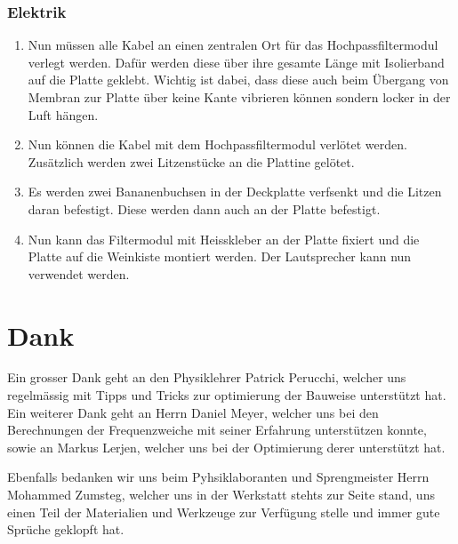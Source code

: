 \documentclass[a4paper,11pt]{report}
\begin{document}
\subsection{Elektrik}
\begin{enumerate}
    \item Nun müssen alle Kabel an einen zentralen Ort für das Hochpassfiltermodul verlegt werden. Dafür werden diese über ihre gesamte Länge mit Isolierband auf die Platte geklebt. Wichtig ist dabei, dass diese auch beim Übergang von Membran zur Platte über keine Kante vibrieren können sondern locker in der Luft hängen.
    \item Nun können die Kabel mit dem Hochpassfiltermodul verlötet werden. Zusätzlich werden zwei Litzenstücke an die Plattine gelötet.
    \item Es werden zwei Bananenbuchsen in der Deckplatte verfsenkt und die Litzen daran befestigt. Diese werden dann auch an der Platte befestigt. 
    \item Nun kann das Filtermodul mit Heisskleber an der Platte fixiert und die Platte auf die Weinkiste montiert werden. Der Lautsprecher kann nun verwendet werden. 
\end{enumerate}

\chapter*{Dank}
Ein grosser Dank geht an den Physiklehrer Patrick Perucchi, welcher uns regelmässig mit Tipps und Tricks zur optimierung der Bauweise unterstützt hat.
Ein weiterer Dank geht an Herrn Daniel Meyer, welcher uns bei den Berechnungen der Frequenzweiche mit seiner Erfahrung unterstützen konnte, sowie an Markus Lerjen, welcher uns bei der Optimierung derer unterstützt hat.

Ebenfalls bedanken wir uns beim Pyhsiklaboranten und Sprengmeister Herrn Mohammed Zumsteg, welcher uns in der Werkstatt stehts zur Seite stand, uns einen Teil der Materialien und Werkzeuge zur Verfügung stelle und immer gute Sprüche geklopft hat.

\newpage
\listoffigures

\newpage


\end{document}
